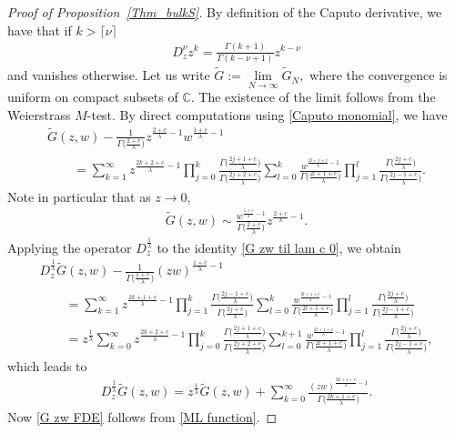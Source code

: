 \documentclass[pdftex]{sigma}
\numberwithin{equation}{section}
\newcommand{\C}{{\mathbb C}}
\newcommand{\1}{\chi}
\begin{document}
\begin{proof}[Proof of Proposition~\ref{Thm_bulkS}]
	By definition of the Caputo derivative, we have that if $k>
	\lceil \nu \rceil$
	\begin{gather} \label{Caputo monomial}
		D_z^\nu z^k =\frac{\Gamma(k+1)}{\Gamma(k-\nu+1)}z^{k-\nu}
	\end{gather}
	and vanishes otherwise.
	Let us write $\widetilde{G}:=\lim\limits_{N \to \infty} \widetilde{G}_N,$ where the convergence is uniform on compact subsets of $\C$. The existence of the limit follows from the Weierstrass $M$-test.
	By direct computations using \eqref{Caputo monomial}, we have
	\begin{gather}
\widetilde{G}(z,w)-\frac{1}{\Gamma\big(\frac{2+c}{\lambda}\big)} z^{ \frac{2+c}{\lambda}-1 } w^{ \frac{1+c}{\lambda}-1 }
			\nonumber\\
\qquad{} =\sum_{k=1}^{\infty} z^{ \frac{2k+2+c}{\lambda}-1 } \prod_{j=0}^k \frac{ \Gamma\big( \frac{2j+1+c}{\lambda} \big) }{\Gamma\big( \frac{2j+2+c}{\lambda} \big)}
			\sum_{l=0}^{k} \frac{ w^{ \frac{2l+1+c}{\lambda}-1 } }{\Gamma\big( \frac{2l+1+c}{\lambda}\big)} \prod_{j=1}^l \frac{\Gamma\big( \frac{2j+c}{\lambda} \big)}{ \Gamma\big(\frac{2j-1+c}{\lambda}\big) } .\label{G zw til lam c 0}
		\end{gather}
	Note in particular that as $z\to 0,$
	\begin{gather} \label{G zw til asym}
		\widetilde{G}(z,w) \sim \frac{w^{ \frac{1+c}{\lambda}-1 } }{\Gamma\big(\frac{2+c}{\lambda}\big)} z^{ \frac{2+c}{\lambda}-1 }.
	\end{gather}
	Applying the operator $D_z^{ \frac{1}{\lambda} }$ to the identity \eqref{G zw til lam c 0}, we obtain
	\begin{gather*}
 D_z^{ \frac{1}{\lambda} } \widetilde{G}(z,w)-\frac{ 1}{\Gamma\big( \frac{1+c}{\lambda} \big)}(zw)^{ \frac{1+c}{\lambda}-1 }
		\\
\qquad{} = \sum_{k=1}^{\infty} z^{ \frac{2k+1+c}{\lambda}-1 } \prod_{j=1}^{k}\frac{ \Gamma \big( \frac{2j-1+c}{\lambda} \big) }{\Gamma\big( \frac{2j+c}{\lambda} \big)} \sum_{l=0}^{k} \frac{ w^{ \frac{2l+1+c}{\lambda}-1 } }{\Gamma\big( \frac{2l+1+c}{\lambda} \big)} \prod_{j=1}^l \frac{\Gamma\big(\frac{2j+c}{\lambda}\big) }{ \Gamma\big( \frac{2j-1+c}{\lambda} \big) }
		\\
\qquad{} = z^{ \frac{1}{\lambda} } \sum_{k=0}^{\infty} z^{ \frac{2k+2+c}{\lambda}-1 } \prod_{j=0}^k \frac{ \Gamma \big( \frac{2j+1+c}{\lambda} \big) }{\Gamma\big( \frac{2j+2+c}{\lambda} \big)} \sum_{l=0}^{k+1} \frac{ w^{ \frac{2l+1+c}{\lambda}-1 } }{\Gamma\big( \frac{2l+1+c}{\lambda} \big)} \prod_{j=1}^l \frac{\Gamma\big(\frac{2j+c}{\lambda}\big) }{ \Gamma\big( \frac{2j-1+c}{\lambda} \big) } ,
	\end{gather*}
	which leads to
	\begin{gather*}
		D_z^{ \frac{1}{\lambda} } \widetilde{G}(z,w)= z^{ \frac{1}{\lambda} } \widetilde{G}(z,w)
		+\sum_{k=0}^{\infty} \frac{ (zw)^{ \frac{2k+1+c}{\lambda}-1 } }{\Gamma\big( \frac{2k+1+c}{\lambda} \big)}.
	\end{gather*}
	Now \eqref{G zw FDE} follows from \eqref{ML function}.
	

\end{proof}
\end{document}
